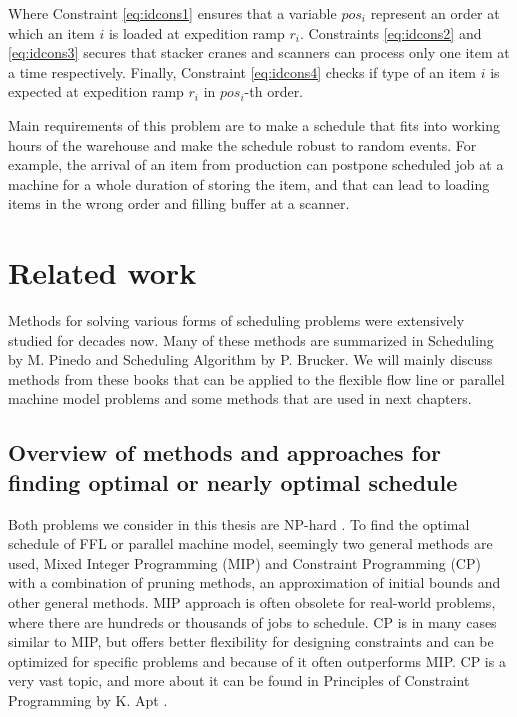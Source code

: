 \documentclass{ctuthesis}
\begin{document}
Where Constraint \ref{eq:idcons1} ensures that a variable $pos_i$ represent an order at which an item $i$ is loaded at expedition ramp $r_i$. Constraints \ref{eq:idcons2} and \ref{eq:idcons3} secures that stacker cranes and scanners can process only one item at a time respectively. Finally, Constraint \ref{eq:idcons4} checks if type of an item $i$ is expected at expedition ramp $r_i$ in $pos_i$-th order.

Main requirements of this problem are to make a schedule that fits into working hours of the warehouse and make the schedule robust to random events. For example, the arrival of an item from production can postpone scheduled job at a machine for a whole duration of storing the item, and that can lead to loading items in the wrong order and filling buffer at a scanner. 



\chapter{Related work}
\label{chap:Related work}
Methods for solving various forms of scheduling problems were extensively studied for decades now. Many of these methods are summarized in Scheduling by M. Pinedo \cite{pinedo} and Scheduling Algorithm by P. Brucker\cite{brucker}. We will mainly discuss methods from these books that can be applied to the flexible flow line or parallel machine model problems and some methods that are used in next chapters.

\section{Overview of methods and approaches for finding optimal or nearly optimal schedule}

Both problems we consider in this thesis are NP-hard \cite{pinedo}. To find the optimal schedule of FFL or parallel machine model, seemingly two general methods are used, Mixed Integer Programming (MIP) and Constraint Programming (CP) with a combination of pruning methods, an approximation of initial bounds and other general methods. MIP approach is often obsolete for real-world problems, where there are hundreds or thousands of jobs to schedule. CP is in many cases similar to MIP, but offers better flexibility for designing constraints and can be optimized for specific problems and because of it often outperforms MIP. CP is a very vast topic, and more about it can be found in Principles of Constraint Programming by K. Apt \cite{cp}.
\end{document}
